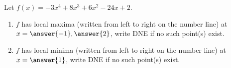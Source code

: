 \documentclass{ximera}
\author{Gregory Hartman \and Matthew Carr}
\begin{document}
\begin{exercise}






Let $f(x)=-3x^4+8x^3+6x^2-24x+2$.
\begin{enumerate}
\item		$f$ has local maxima (written from left to right on the number line) at $x=\answer{-1},\answer{2}$, write DNE if no such point(s) exist.
\item		$f$ has local minima (written from left to right on the number line) at $x=\answer{1}$, write DNE if no such point(s) exist.
\end{enumerate}

\end{exercise}
\end{document}
